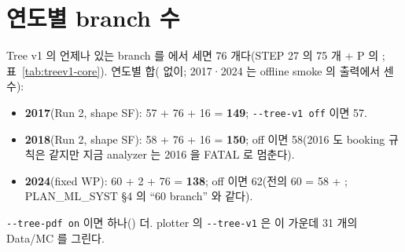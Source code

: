 \section{연도별 branch 수}\label{sec:treev1-count}
Tree v1 의 언제나 있는 branch 를  에서 세면 76 개다(STEP 27 의 75 개 + P 의 ; 표~\ref{tab:treev1-core}). 연도별 합( 없이; 2017·2024 는 offline smoke 의 출력에서 센 수):
\begin{itemize}
\item \textbf{2017}(Run 2, shape SF): 57 + 76 + 16 = \textbf{149}; \texttt{-{}-tree-v1 off} 이면 57.
\item \textbf{2018}(Run 2, shape SF): 58 + 76 + 16 = \textbf{150}; off 이면 58(2016 도 booking 규칙은 같지만 지금 analyzer 는 2016 을 FATAL 로 멈춘다).
\item \textbf{2024}(fixed WP): 60 + 2 + 76 = \textbf{138}; off 이면 62(전의 60 = 58 + ; PLAN\_ML\_SYST §4 의 ``60 branch'' 와 같다).
\end{itemize}
\texttt{-{}-tree-pdf on} 이면 하나() 더. plotter 의 \texttt{-{}-tree-v1} 은 이 가운데 31 개의 Data/MC 를 그린다.
